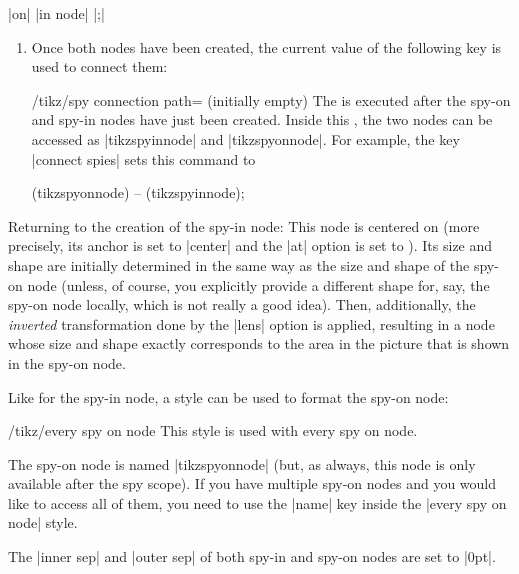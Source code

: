 \begin{command}{\spy {} |on| 
    |in node| |;|}
\begin{enumerate}
  \item Once both nodes have been created, the current value of the
    following key is used to connect them:
    \begin{key}{/tikz/spy connection path= (initially
        \normalfont empty)}
      The  is executed after the spy-on and spy-in nodes
      have just been created. Inside this , the two nodes
      can be accessed as |tikzspyinnode| and  |tikzspyonnode|.
      For example, the key |connect spies| sets this command to
\begin{codeexample}
\draw[thin] (tikzspyonnode) -- (tikzspyinnode);        
\end{codeexample}
    \end{key}
  \end{enumerate}
  Returning to the creation of the spy-in node: This node is centered on
   (more precisely, its anchor is set to |center| and
  the |at| option is set to ). Its size and shape are
  initially determined in the same way as the size and shape of the
  spy-on node (unless, of course, you explicitly provide a different
  shape for, say, the spy-on node locally, which is not really a good
  idea). Then, additionally, the \emph{inverted} transformation done
  by the |lens| option is applied, resulting in a node whose size and
  shape exactly corresponds to the area in the picture that is shown
  in the spy-on node.
\begin{codeexample}[]
\end{codeexample}

  Like for the spy-in node, a style can be used to format the spy-on
  node:
  \begin{stylekey}{/tikz/every spy on node}
    This style is used with every spy on node.
  \end{stylekey}
  The spy-on node is named |tikzspyonnode| (but, as always, this node
  is only available after the spy scope). If you have multiple
  spy-on nodes and you would like to access all of them, you need to
  use the |name| key inside the |every spy on node| style.
  
  The |inner sep| and |outer sep| of both spy-in and spy-on nodes are
  set to |0pt|.   
\end{command}




